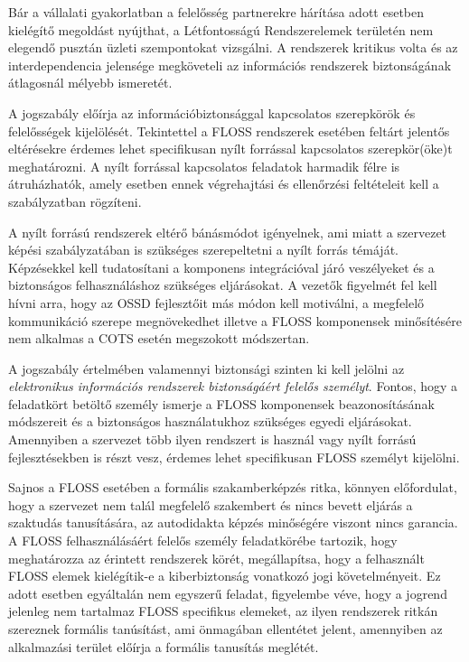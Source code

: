 \documentclass[12pt,magyar,a4paper,oneside]{scrreprt}
\begin{document}
Bár a vállalati gyakorlatban a felelősség partnerekre hárítása adott
esetben kielégítő megoldást nyújthat, a Létfontosságú Rendszerelemek
területén nem elegendő pusztán üzleti szempontokat vizsgálni. A
rendszerek kritikus volta és az interdependencia jelensége megköveteli
az információs rendszerek biztonságának átlagosnál mélyebb ismeretét.

A jogszabály előírja az információbiztonsággal kapcsolatos szerepkörök
és felelősségek kijelölését. Tekintettel a FLOSS rendszerek esetében
feltárt jelentős eltérésekre érdemes lehet specifikusan nyílt forrással
kapcsolatos szerepkör(öke)t meghatározni. A nyílt forrással kapcsolatos
feladatok harmadik félre is átruházhatók, amely esetben ennek
végrehajtási és ellenőrzési feltételeit kell a szabályzatban rögzíteni.

A nyílt forrású rendszerek eltérő bánásmódot igényelnek, ami miatt a
szervezet képési szabályzatában is szükséges szerepeltetni a nyílt
forrás témáját. Képzésekkel kell tudatosítani a komponens integrációval
járó veszélyeket és a biztonságos felhasználáshoz szükséges eljárásokat.
A vezetők figyelmét fel kell hívni arra, hogy az OSSD fejlesztőit más
módon kell motiválni, a megfelelő kommunikáció szerepe megnövekedhet
illetve a FLOSS komponensek minősítésére nem alkalmas a COTS esetén
megszokott módszertan.

A jogszabály értelmében valamennyi biztonsági szinten ki kell jelölni az
\emph{elektronikus információs rendszerek biztonságáért felelős
személyt}. Fontos, hogy a feladatkört betöltő személy ismerje a FLOSS
komponensek beazonosításának módszereit és a biztonságos használatukhoz
szükséges egyedi eljárásokat. Amennyiben a szervezet több ilyen
rendszert is használ vagy nyílt forrású fejlesztésekben is részt vesz,
érdemes lehet specifikusan FLOSS személyt kijelölni.

Sajnos a FLOSS esetében a formális szakamberképzés ritka, könnyen
előfordulat, hogy a szervezet nem talál megfelelő szakembert és nincs
bevett eljárás a szaktudás tanusítására, az autodidakta képzés
minőségére viszont nincs garancia. A FLOSS felhasználásáért felelős
személy feladatkörébe tartozik, hogy meghatározza az érintett rendszerek
körét, megállapítsa, hogy a felhasznált FLOSS elemek kielégítik-e a
kiberbiztonság vonatkozó jogi követelményeit. Ez adott esetben
egyáltalán nem egyszerű feladat, figyelembe véve, hogy a jogrend
jelenleg nem tartalmaz FLOSS specifikus elemeket, az ilyen rendszerek
ritkán szereznek formális tanúsítást, ami önmagában ellentétet jelent,
amennyiben az alkalmazási terület előírja a formális tanusítás meglétét.
\end{document}
